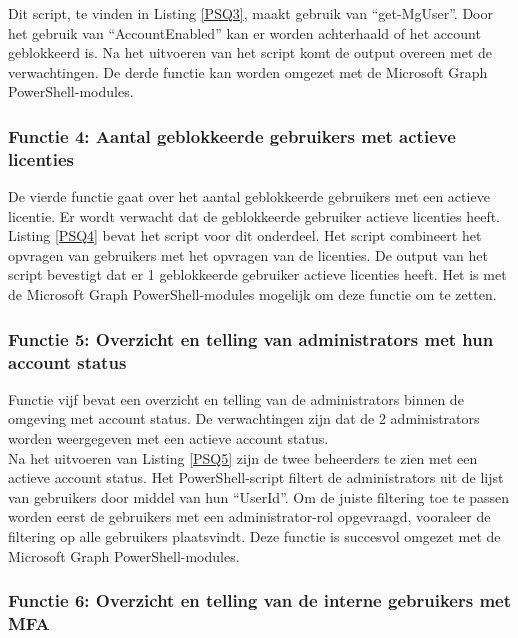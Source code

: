 Dit script, te vinden in Listing \ref{PSQ3}, maakt gebruik van “get-MgUser”. Door het gebruik van “AccountEnabled” kan er worden achterhaald of het account geblokkeerd is. Na het uitvoeren van het script komt de output overeen met de verwachtingen. De derde functie kan worden omgezet met de Microsoft Graph PowerShell-modules. 

\subsubsection{Functie 4: Aantal geblokkeerde gebruikers met actieve licenties}

De vierde functie gaat over het aantal geblokkeerde gebruikers met een actieve licentie. Er wordt verwacht dat de geblokkeerde gebruiker actieve licenties heeft. \\

Listing \ref{PSQ4} bevat het script voor dit onderdeel. Het script combineert het opvragen van gebruikers met het opvragen van de licenties. De output van het script bevestigt dat er 1 geblokkeerde gebruiker actieve licenties heeft. Het is met de Microsoft Graph PowerShell-modules mogelijk om deze functie om te zetten.

\subsubsection{Functie 5: Overzicht en telling van administrators met hun account status}

Functie vijf bevat een overzicht en telling van de administrators binnen de omgeving met account status. De verwachtingen zijn dat de 2 administrators worden weergegeven met een actieve account status. \\

Na het uitvoeren van Listing \ref{PSQ5} zijn de twee beheerders te zien met een actieve account status. Het PowerShell-script filtert de administrators uit de lijst van gebruikers door middel van hun “UserId”. Om de juiste filtering toe te passen worden eerst de gebruikers met een administrator-rol opgevraagd, vooraleer de filtering op alle gebruikers plaatsvindt. Deze functie is succesvol omgezet met de Microsoft Graph PowerShell-modules.

\subsubsection{Functie 6: Overzicht en telling van de interne gebruikers met MFA}

